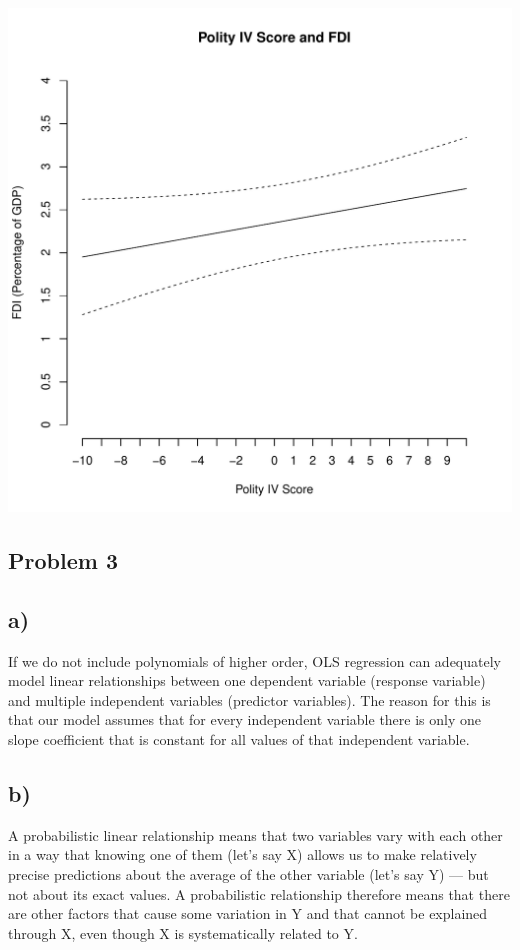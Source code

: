 \documentclass[12pt,letter]{article}\usepackage[]{graphicx}\usepackage[]{color}
\makeatletter
\def\maxwidth{ %
  \ifdim\Gin@nat@width>\linewidth
    \linewidth
  \else
    \Gin@nat@width
  \fi
}
\newenvironment{knitrout}{}{} %
\makeatother
\begin{document}
\begin{knitrout}
\includegraphics[width=\maxwidth]{figure/unnamed-chunk-3-1} 

\end{knitrout}



\subsection*{Problem 3}

\subsection{a)} If we do not include polynomials of higher order, OLS regression can adequately model linear relationships between one dependent variable (response variable) and multiple independent variables (predictor variables). The reason for this is that our model assumes that for every independent variable there is only one slope coefficient that is constant for all values of that independent variable.

\subsection{b)} A probabilistic linear relationship means that two variables vary with each other in a way that knowing one of them (let's say X) allows us to make relatively precise predictions about the average of the other variable (let's say Y) --- but not about its exact values. A probabilistic relationship therefore means that there are other factors that cause some variation in Y and that cannot be explained through X, even though X is systematically related to Y.
\end{document}
